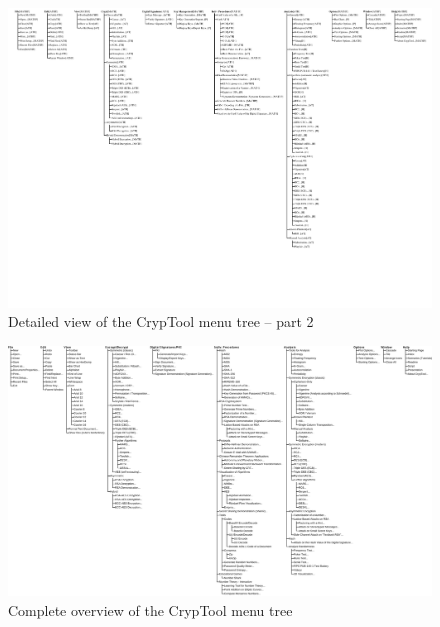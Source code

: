 \begin{figure}[b]
\begin{center}
\includegraphics[scale=1.1, clip, viewport=404 117 828 598]{figures/cryptool-menu-detail-en}
\caption{Detailed view of the CrypTool menu tree -- part 2}
\label{menu-detail-2}
\end{center}
\end{figure}
\clearpage
\begin{figure}[hb]
\begin{center}
\vspace{-30pt}
\includegraphics[scale=0.75, angle=270, viewport=14 5 829 590]{figures/cryptool-menu-en}
\caption{Complete overview of the CrypTool menu tree} 
\label{menuoverview}
\end{center}
\end{figure}
\clearpage
